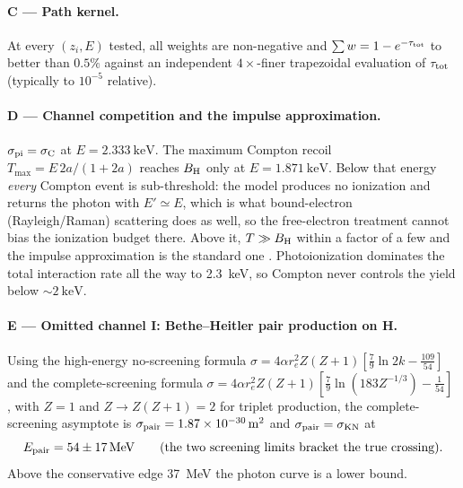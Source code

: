 \documentclass[11pt,a4paper]{article}
\begin{document}
\paragraph{C --- Path kernel.}
At every $(z_i,E)$ tested, all weights are non-negative and
$\sum w = 1-e^{-\tau_{\rm tot}}$ to better than $0.5\%$ against an
independent $4\times$-finer trapezoidal evaluation of $\tau_{\rm tot}$
(typically to $10^{-5}$ relative).

\paragraph{D --- Channel competition and the impulse approximation.}
$\sigma_{\rm pi}=\sigma_{\rm C}$ at
$E=\SI{2.333}{\kilo\electronvolt}$. The maximum Compton recoil
$T_{\max}=E\,2a/(1+2a)$ reaches $B_{\rm H}$ only at
$E=\SI{1.871}{\kilo\electronvolt}$. Below that energy \emph{every} Compton
event is sub-threshold: the model produces no ionization and returns the
photon with $E'\simeq E$, which is what bound-electron (Rayleigh/Raman)
scattering does as well, so the free-electron treatment cannot bias the
ionization budget there. Above it, $T\gg B_{\rm H}$ within a factor of a few
and the impulse approximation is the standard one
\citep{zdziarski89}. Photoionization dominates the total interaction rate all
the way to \SI{2.3}{\kilo\electronvolt}, so Compton never controls the yield
below $\sim\SI{2}{\kilo\electronvolt}$.

\paragraph{E --- Omitted channel I: Bethe--Heitler pair production on H.}
Using the high-energy no-screening formula
$\sigma = 4\alpha r_e^2 Z(Z+1)[\tfrac79\ln 2k - \tfrac{109}{54}]$ and the
complete-screening formula
$\sigma = 4\alpha r_e^2 Z(Z+1)[\tfrac79\ln(183Z^{-1/3}) - \tfrac{1}{54}]$
\citep[][\S26]{heitler54,motz69}, with $Z=1$ and $Z\to Z(Z+1)=2$ for triplet
production, the complete-screening asymptote is
$\sigma_{\rm pair}=\SI{1.87e-30}{\metre\squared}$ and
$\sigma_{\rm pair}=\sigma_{\rm KN}$ at
\begin{equation}
  E_{\rm pair} = 54 \pm \SI{17}{\mega\electronvolt}
  \qquad\text{(the two screening limits bracket the true crossing).}
\end{equation}
Above the conservative edge \SI{37}{\mega\electronvolt} the photon curve is a
lower bound.
\end{document}
